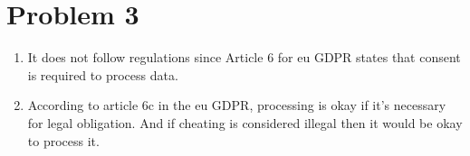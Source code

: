 \documentclass[a4paper]{article}
\newcommand{\enuma}[1]{\begin{enumerate}[labelsep=0.3cm,labelindent=0pt,itemindent=0em,labelwidth=\widthof{\ref{last-item}}, label=(\alph*)]#1 \end{enumerate}}
\begin{document}
\section*{Problem 3}
\enuma{
\item It does not follow regulations since Article 6 for eu GDPR states that consent is required to process data. 
\item According to article 6c in the eu GDPR, processing is okay if it's necessary for legal obligation. And if cheating is considered illegal then it would be okay to process it.
}
\printbibliography
\end{document}
